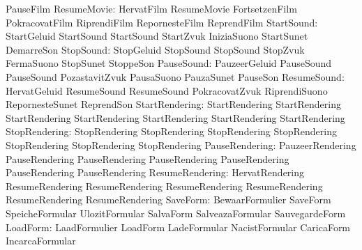                            PauseFilm
              ResumeMovie: HervatFilm                ResumeMovie
                           FortsetzenFilm            PokracovatFilm
                           RiprendiFilm              RepornesteFilm
                           ReprendFilm
               StartSound: StartGeluid               StartSound
                           StartSound                StartZvuk
                           IniziaSuono               StartSunet
                           DemarreSon
                StopSound: StopGeluid                StopSound
                           StopSound                 StopZvuk
                           FermaSuono                StopSunet
                           StoppeSon
               PauseSound: PauzeerGeluid             PauseSound
                           PauseSound                PozastavitZvuk
                           PausaSuono                PauzaSunet
                           PauseSon
              ResumeSound: HervatGeluid              ResumeSound
                           ResumeSound               PokracovatZvuk
                           RiprendiSuono             RepornesteSunet
                           ReprendSon
           StartRendering: StartRendering            StartRendering
                           StartRendering            StartRendering
                           StartRendering            StartRendering
                           StartRendering
            StopRendering: StopRendering             StopRendering
                           StopRendering             StopRendering
                           StopRendering             StopRendering
                           StopRendering
           PauseRendering: PauzeerRendering          PauseRendering
                           PauseRendering            PauseRendering
                           PauseRendering            PauseRendering
                           PauseRendering
          ResumeRendering: HervatRendering           ResumeRendering
                           ResumeRendering           ResumeRendering
                           ResumeRendering           ResumeRendering
                           ResumeRendering
                 SaveForm: BewaarFormulier           SaveForm
                           SpeicheFormular           UlozitFormular
                           SalvaForm                 SalveazaFormular
                           SauvegardeForm
                 LoadForm: LaadFormulier             LoadForm
                           LadeFormular              NacistFormular
                           CaricaForm                IncarcaFormular
